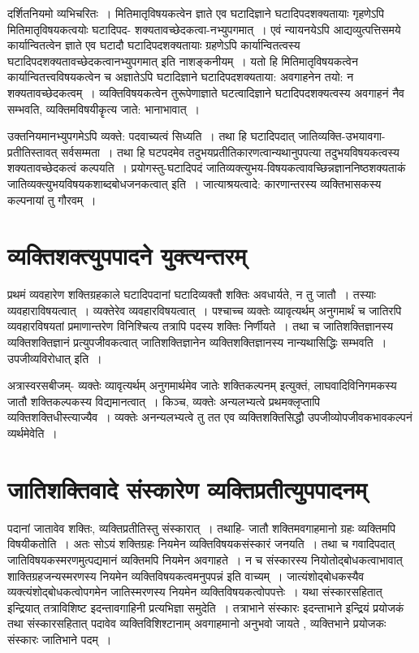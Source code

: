 {दर्शितनियमो व्यभिचरितः~। मितिमातृविषयकत्वेन ज्ञाते एव घटादिज्ञाने घटादिपदशक्यतायाः गृहणेऽपि मितिमातृविषयकत्वयोः घटादिपद- शक्यतावच्छेदकत्वा-नभ्युपगमात्~। एवं न्यायनयेऽपि आद्यव्युत्पत्तिसमये कार्यान्वितत्वेन ज्ञाते एव घटादौ घटादि\-पदशक्यतायाः ग्रहणेऽपि कार्यान्वितत्वस्य घटादिपदशक्यतावच्छेदकत्वानभ्युपगमात् इति नाशङ्कनीयम्~। यतो हि मितिमातृविषयकत्वेन कार्यान्वितत्त्वविषयकत्वेन च अज्ञातेऽपि घटादिज्ञाने घटादिपदशक्यताया: अवगाहनेन तयो: न शक्यतावच्छेदकत्वम्~। व्यक्तिविषयकत्वेन तु\break रूपेणाज्ञाते घटत्वादिज्ञाने घटादिपदशक्यत्वस्य अवगाहनं नैव सम्भवति, व्यक्तिमविषयीकॄत्य जाते: भानाभावात्~। 
\newpage

उक्तनियमानभ्युपगमेऽपि व्यक्ते: पदवाच्यत्वं सिध्यति~। तथा हि घटादिपदात् जाति\-व्यक्ति-उभयावगा-प्रतीतिस्तावत् सर्वसम्मता~। तथा हि घटपदमेव तदुभयप्रतीतिकारणत्वान्यथानुपपत्या तदुभयविषयकत्वस्य शक्यतावच्छेदकत्वं कल्पयति~। प्रयोगस्तु-घटादिपदं जातिव्यक्त्युभय-विषयकत्वावच्छिन्नज्ञाननिष्ठशक्यताकं जातिव्यक्त्युभयविषयकशाब्द\-\break बोधजनकत्वात् इति~। जात्याश्रयत्वादे: कारणान्तरस्य व्यक्तिभासकस्य कल्पनायां तु \-गौरवम्~। 

\section*{व्यक्तिशक्त्युपपादने युक्त्यन्तरम्} 

प्रथमं व्यवहारेण शक्तिग्रहकाले घटादिपदानां घटादिव्यक्तौ शक्तिः अवधार्यते, न तु जातौ~। तस्याः व्यवहाराविषयत्वात्~। व्यक्तेरेव व्यवहारविषयत्वात्~। पश्चाच्च व्यक्तेः व्यावृत्यर्थम् अनुगमार्थं च जातिरपि व्यवहारविषयतां प्रमाणान्तरेण विनिश्चित्य तत्रापि पदस्य शक्तिः निर्णीयते~। तथा च जातिशक्तिज्ञानस्य व्यक्तिशक्तिज्ञानं प्रत्युपजीवकत्वात् जातिशक्तिज्ञानेन व्यक्तिशक्तिज्ञानस्य नान्यथासिद्धिः सम्भवति~। उपजीव्यविरोधात् इति~। 

अत्रास्वरसबीजम्- व्यक्तेः व्यावृत्यर्थम् अनुगमार्थमेव जातेः शक्तिकल्पनम् इत्युक्तं, लाघवादिविनिगमकस्य जातौ शक्तिकल्पकस्य विद्यमानत्वात्~। किञ्च, व्यक्तेः अन्यलभ्यत्वे प्रथमक्लृप्तापि व्यक्तिशक्तिधीस्त्याज्यैव~। व्यक्तेः अनन्यलभ्यत्वे तु तत एव व्यक्तिशक्तिसिद्धौ उपजीव्योपजीवकभावकल्पनं व्यर्थमेवेति~। 

\section*{जातिशक्तिवादे संस्कारेण व्यक्तिप्रतीत्युपपादनम्}

पदानां जातावेव शक्तिः, व्यक्तिप्रतीतिस्तु संस्कारात्~। तथाहि- जातौ शक्तिमवगाहमानो ग्रहः व्यक्तिमपि विषयीकतोति~। अतः सोऽयं शक्तिग्रहः नियमेन व्यक्तिविषयकसंस्कारं जनयति~। तथा च गवादिपदात् जातिविषयकस्मरणमुत्पद्यमानं व्यक्तिमपि नियमेन अवगाहते~। न च संस्कारस्य नियोतोद्बोधकत्वाभावात् शाक्तिग्रहजन्यस्मरणस्य नियमेन व्यक्तिविषयकत्वमनुपपन्नं इति वाच्यम्~। जात्यंशोद्बोधकस्यैव व्यक्त्यंशोद्बोधकत्वोपगमेन जातिस्मरणस्य नियमेन व्यक्तिविषयकत्वोपपत्तेः~। यथा संस्कारसहितात् इन्द्रियात् तत्राविशिष्ट इदन्तावगाहिनी प्रत्यभिज्ञा  समुदेति~। तत्राभाने संस्कारः इदन्ताभाने इन्द्रियं प्रयोजकं तथा संस्कारसहितात् पदावेव व्यक्तिविशिश्टानाम्  अवगाहमानो अनुभवो जायते , व्यक्तिभाने प्रयोजकः संस्कारः जातिभाने पदम्~। 

}
